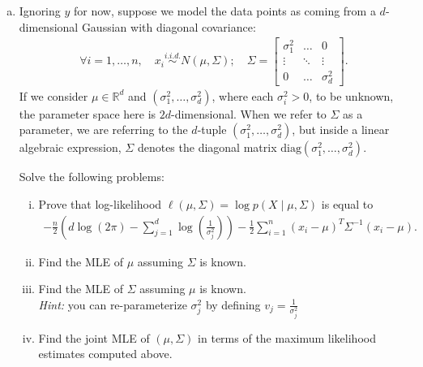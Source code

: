 \documentclass{article}
\begin{document}
\begin{enumerate}[(a)]
    \item %
    Ignoring $y$ for now, suppose we model the data points as coming from a $d$-dimensional Gaussian with diagonal covariance:
    \begin{align*}
       \forall i = 1, \ldots, n, \quad x_i \stackrel{i.i.d.}{\sim} N(\mu, \Sigma); \quad  \Sigma = \begin{bmatrix} \sigma_1^2 & \ldots & 0 \\ 
        \vdots & \ddots & \vdots \\ 0 & \ldots & \sigma_d^2\end{bmatrix}.
    \end{align*}
    If we consider $\mu\in\mathbb R^d$ and $(\sigma_1^2,\ldots, \sigma_d^2)$, where each $\sigma_i^2 > 0$, to be unknown, the parameter space here is $2d$-dimensional. When we refer to $\Sigma$ as a parameter, we are referring to the $d$-tuple $(\sigma_1^2,\ldots, \sigma_d^2)$, but inside a linear algebraic expression, $\Sigma$ denotes the diagonal matrix $\mathrm{diag}(\sigma_1^2,\ldots,\sigma_d^2)$.

    Solve the following problems:
    \begin{enumerate}[(i)]
        \item Prove that log-likelihood $\ell(\mu, \Sigma) = \log p(X \mid \mu, \Sigma)$ is equal to
        \begin{align*}
            -\frac{n}{2}\left(d \log (2\pi) - \sum_{j = 1}^{d} \log\left(\frac{1}{\sigma_{j}^{2}}\right)\right) - \frac{1}{2} \sum_{i = 1}^{n}(x_{i} - \mu)^{T}\Sigma^{-1}(x_{i} - \mu).
        \end{align*}

        \item Find the MLE of $\mu$ assuming $\Sigma$ is known.
        \item Find the MLE of $\Sigma$ assuming $\mu$ is known. \\
        \textit{Hint:} you can re-parameterize $\sigma_j^2$ by defining $v_j=\frac{1}{\sigma_j^2}$
        \item Find the joint MLE of $(\mu, \Sigma)$ in terms of the maximum likelihood estimates computed above.
    \end{enumerate}
    

\end{enumerate}
\end{document}
